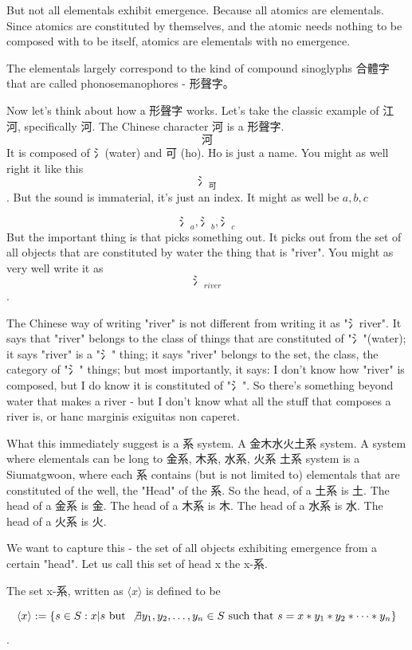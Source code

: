 But not all elementals exhibit emergence. Because all atomics are elementals. Since atomics are constituted by themselves, and the atomic needs nothing to be composed with to be itself, atomics are elementals with no emergence. 


The elementals largely correspond to the kind of compound sinoglyphs 合體字 that are called phonosemanophores - 形聲字。 

Now let's think about how a 形聲字 works. Let's take the classic example of 江河, specifically 河. The Chinese character 河 is a 形聲字. 
$$\text{河}$$
It is composed of 氵(water) and 可 (ho). Ho is just a name. You might as well right it like this $$\text{氵}_{\text{可}}$$. But the sound is immaterial, it's just an index. It might as well be $a,b,c$

$$\text{氵}_{a},\text{氵}_b,\text{氵}_c$$
But the important thing is that picks something out. It picks out from the set of all objects that are constituted by water the thing that is "river". You might as very well write it as $$\text{氵}_{river}$$. 

The Chinese way of writing "river" is not different from writing it as "氵river". It says that "river" belongs to the class of things that are constituted of "氵"(water); it says "river" is a "氵" thing; it says "river" belongs to the set, the class, the category of "氵" things; but most importantly, it says: I don't know how "river" is composed, but I do know it is constituted of "氵". So there's something beyond water that makes a river - but I don't know what all the stuff that composes a river is, or hanc marginis exiguitas non caperet.

What this immediately suggest is a 系 system. A 金木水火土系 system. A system where elementals can be long to 金系, 木系, 水系, 火系 土系 system is a Siumatgwoon, where each 系 contains (but is not limited to) elementals that are constituted of the well, the "Head" of the 系. So the head, of a 土系 is 土. The head of a 金系 is 金. The head of a 木系 is 木. The head of a 水系 is 水. The head of a 火系 is 火. 

We want to capture this - the set of all objects exhibiting emergence from a certain "head". Let us call this set of head x the x-系. 



\begin{definition}\label{def:hai-elements}
    The set x-系, written as $\langle x \rangle$ is defined to be 
    
    $$\langle x \rangle := \{ s\in S: x|s \text{ but } \not \exists y_1, y_2,\ldots, y_n \in S \text{ such that } s=x*y_1*y_2*\cdots*y_n\}$$. 
    \end{definition}

